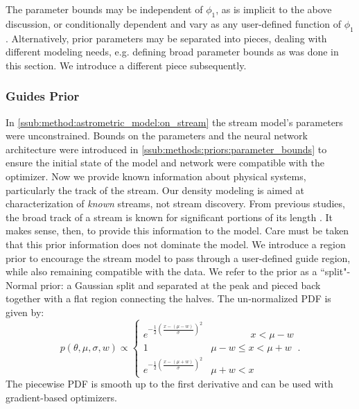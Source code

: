\documentclass[twocolumn]{aastex631}
\newcommand{\Exp}[1]{e^{#1}}
\newcommand{\pdf}{p}
\begin{document}
            The parameter bounds may be independent of $\phi_1$, as is implicit
            to the above discussion, or conditionally dependent and vary as any
            user-defined function of $\phi_1$.  Alternatively, prior parameters
            may be separated into pieces, dealing with different modeling needs,
            e.g. defining broad parameter bounds as was done in this section.
            We introduce a different piece subsequently.


        \subsubsection{Guides Prior} \label{sub:methods:priors:track_region_prior}

            In \autoref{ssub:method:astrometric_model:on_stream} the stream
            model's parameters were unconstrained. Bounds on the parameters and
            the neural network architecture were introduced in
            \autoref{ssub:methods:priors:parameter_bounds} to ensure the initial
            state of the model and network were compatible with the optimizer.
            Now we provide known information about physical systems,
            particularly the track of the stream.  Our density modeling is aimed
            at characterization of \textit{known} streams, not stream discovery.
            From previous studies, the broad track of a stream is known for
            significant portions of its length \citep[e.g. see the atlas
            in][]{Mateu2022}. It makes sense, then, to provide this information
            to the model. Care must be taken that this prior information does
            not dominate the model.  We introduce a region prior to encourage
            the stream model to pass through a user-defined guide region, while
            also remaining compatible with the data.  We refer to the prior as a
            ``split"-Normal prior: a Gaussian split and separated at the peak
            and pieced back together with a flat region connecting the halves.
            The un-normalized PDF is given by:
            \begin{equation}
                \pdf(\theta,\mu,\sigma,w) \propto \begin{cases} 
                   \Exp{-\frac{1}{2}\left(\frac{x-(\mu-w)}{\sigma}\right)^2} & \phantom{\mu - w <}\ x < \mu - w \\
                    1 & \mu - w \leq x < \mu + w \\
                    \Exp{-\frac{1}{2}\left(\frac{x-(\mu+w)}{\sigma}\right)^2} & \mu + w < x
                \end{cases}.
            \end{equation}
            The piecewise PDF is smooth up to the first derivative and can be
            used with gradient-based optimizers.
\end{document}
